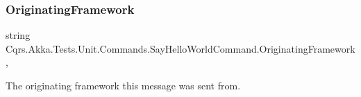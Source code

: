 \subsubsection{\texorpdfstring{Originating\+Framework}{OriginatingFramework}}
{\footnotesize\ttfamily string Cqrs.\+Akka.\+Tests.\+Unit.\+Commands.\+Say\+Hello\+World\+Command.\+Originating\+Framework\hspace{0.3cm}{\ttfamily [get]}, {\ttfamily [set]}}



The originating framework this message was sent from. 

